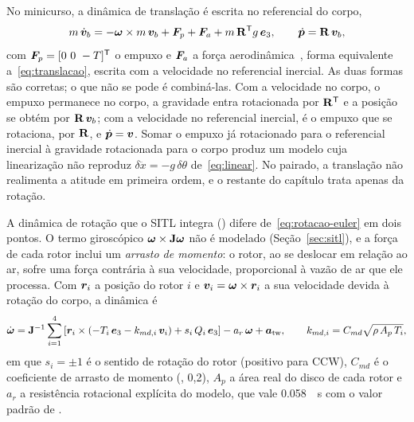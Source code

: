 No minicurso, a dinâmica de translação é escrita no referencial do corpo,
\begin{equation}
m\,\dot{\bm{v}}_b = -\bm{\omega}\times m\,\bm{v}_b + \bm{F}_p
                      + \bm{F}_a + m\,\mathbf{R}^{\mathsf{T}} g\,\bm{e}_3,
\qquad \dot{\bm{p}} = \mathbf{R}\,\bm{v}_b,
\label{eq:translacao-corpo}
\end{equation}
com $\bm{F}_p = [0\ 0\ -T]^{\mathsf{T}}$ o empuxo e $\bm{F}_a$ a força
aerodinâmica~\cite{fischer2025}, forma equivalente a~\eqref{eq:translacao},
escrita com a velocidade no referencial inercial. As duas formas são
corretas; o que não se pode é combiná-las. Com a velocidade no corpo, o empuxo
permanece no corpo, a gravidade entra rotacionada por $\mathbf{R}^{\mathsf{T}}$
e a posição se obtém por $\mathbf{R}\,\bm{v}_b$; com a velocidade no
referencial inercial, é o empuxo que se rotaciona, por $\mathbf{R}$, e
$\dot{\bm{p}} = \bm{v}$. Somar o empuxo já rotacionado para o
referencial inercial à gravidade rotacionada para o corpo produz um modelo cuja
linearização não reproduz $\delta\ddot x = -g\,\delta\theta$
de~\eqref{eq:linear}. No pairado, a translação não realimenta a atitude em
primeira ordem, e o restante do capítulo trata apenas da rotação.

A dinâmica de rotação que o SITL integra () difere
de~\eqref{eq:rotacao-euler} em dois pontos. O termo giroscópico
$\bm{\omega}\times\mathbf{J}\bm{\omega}$ não é modelado
(Seção~\ref{sec:sitl}), e a força de cada rotor inclui um \emph{arrasto de
momento}: o rotor, ao se deslocar em relação ao ar, sofre uma força contrária
à sua velocidade, proporcional à vazão de ar que ele processa. Com
$\bm{r}_i$ a posição do rotor $i$ e
$\bm{v}_i = \bm{\omega}\times\bm{r}_i$ a sua velocidade devida à
rotação do corpo, a dinâmica é
\begin{equation}
\dot{\bm{\omega}} = \mathbf{J}^{-1}\sum_{i=1}^{4}\left[
    \bm{r}_i\times\left(-T_i\,\bm{e}_3 - k_{md,i}\,\bm{v}_i\right)
    + s_i\,Q_i\,\bm{e}_3\right]
  - a_r\,\bm{\omega} + \bm{a}_{\mathrm{tw}},
\qquad
k_{md,i} = C_{md}\sqrt{\rho\,A_p\,T_i},
\label{eq:rotacao-sitl-completa}
\end{equation}
em que $s_i = \pm 1$ é o sentido de rotação do rotor (positivo para CCW),
$C_{md}$ é o coeficiente de arrasto de momento (,
0,2), $A_p$ a área real do disco de cada rotor e $a_r$ a resistência
rotacional explícita do modelo, que vale \SI{0.058}{\per\second} com o valor
padrão de .

